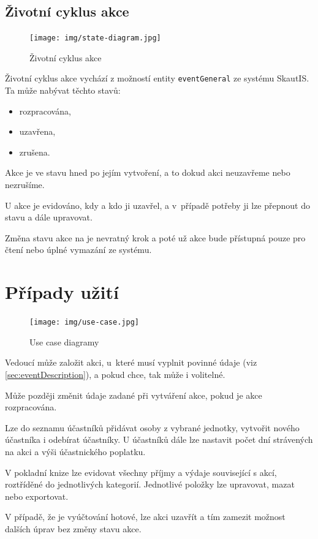 \documentclass[thesis=B,czech]{FITthesis}[2011/06/14]
\begin{document}
\subsection{Životní cyklus akce}
 \begin{figure}[h] \centering
 	\texttt{[image: img/state-diagram.jpg]}
 	\caption[Životní cyklus akce]{Životní cyklus akce}\label{fig:state-diagram}
 \end{figure}
 Životní cyklus akce vychází z možností entity \texttt{eventGeneral} ze systému SkautIS. Ta může nabývat těchto stavů:
 
 \begin{itemize}
 	\item rozpracována,
	\item uzavřena,
	\item zrušena.
 \end{itemize} 
 
Akce je ve stavu  hned po jejím vytvoření, a to dokud akci neuzavřeme nebo nezrušíme.

U  akce je evidováno, kdy a kdo ji uzavřel, a v~případě potřeby ji lze přepnout do stavu  a dále upravovat.

Změna stavu akce na  je nevratný krok a poté už akce bude přístupná pouze pro čtení nebo úplné vymazání ze systému.

\section{Případy užití}
\begin{figure}[h]\centering
 	\texttt{[image: img/use-case.jpg]}
 	\caption[Případy užití]{Use case diagramy}\label{fig:use-case}
\end{figure}
Vedoucí může založit akci, u~které musí vyplnit povinné údaje (viz \ref{sec:eventDescription}), a pokud chce, tak může i volitelné.

Může později změnit údaje zadané při vytváření akce, pokud je akce rozpracována. 

Lze do seznamu účastníků přidávat osoby z vybrané jednotky, vytvořit nového účastníka i odebírat účastníky. U účastníků dále lze nastavit počet dní strávených na akci a výši účastnického poplatku. 

V pokladní knize lze evidovat všechny příjmy a výdaje související s akcí, roztříděné do jednotlivých kategorií. Jednotlivé položky lze upravovat, mazat nebo exportovat.

V případě, že je vyúčtování hotové, lze akci uzavřít a tím zamezit možnost dalších úprav bez změny stavu akce.
\end{document}
